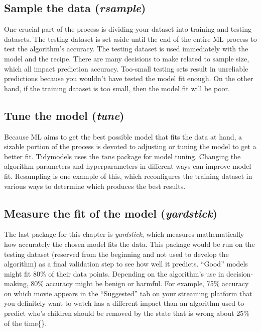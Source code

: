\documentclass[
  krantz2]{krantz}
\begin{document}
\hypertarget{sample-the-data-rsample}{%
\subsection{\texorpdfstring{Sample the data (\emph{rsample})}{Sample the data (rsample)}}\label{sample-the-data-rsample}}

One crucial part of the process is dividing your dataset into training and testing datasets. The testing dataset is set aside until the end of the entire ML process to test the algorithm's accuracy. The testing dataset is used immediately with the model and the recipe. There are many decisions to make related to sample size, which all impact prediction accuracy. Too-small testing sets result in unreliable predictions because you wouldn't have tested the model fit enough. On the other hand, if the training dataset is too small, then the model fit will be poor.

\hypertarget{tune-the-model-tune}{%
\subsection{\texorpdfstring{Tune the model (\emph{tune})}{Tune the model (tune)}}\label{tune-the-model-tune}}

Because ML aims to get the best possible model that fits the data at hand, a sizable portion of the process is devoted to adjusting or tuning the model to get a better fit. Tidymodels uses the \emph{tune} package for model tuning. Changing the algorithm parameters and hyperparameters in different ways can improve model fit. Resampling is one example of this, which reconfigures the training dataset in various ways to determine which produces the best results.

\hypertarget{measure-the-fit-of-the-model-yardstick}{%
\subsection{\texorpdfstring{Measure the fit of the model (\emph{yardstick})}{Measure the fit of the model (yardstick)}}\label{measure-the-fit-of-the-model-yardstick}}

The last package for this chapter is \emph{yardstick}, which measures mathematically how accurately the chosen model fits the data. This package would be run on the testing dataset (reserved from the beginning and not used to develop the algorithm) as a final validation step to see how well it predicts. ``Good'' models might fit 80\% of their data points. Depending on the algorithm's use in decision-making, 80\% accuracy might be benign or harmful. For example, 75\% accuracy on which movie appears in the ``Suggested'' tab on your streaming platform that you definitely want to watch has a different impact than an algorithm used to predict who's children should be removed by the state that is wrong about 25\% of the time\{\citet{eubanks2018}\}.
\end{document}
